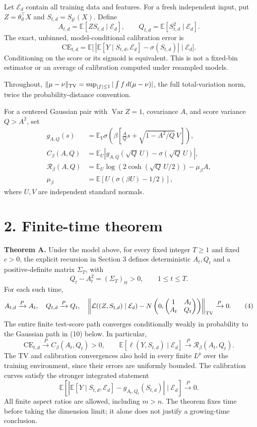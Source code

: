 \documentclass[
  11pt,
  a4paper,
]{article}
\begin{document}
Let \(\mathcal E_d\) contain all training data and features. For a fresh
independent input, put \(Z=\theta_d^\top X\) and \(S_{t,d}=S_{b^t}(X)\).
Define \[
A_{t,d}=\mathbb E[ZS_{t,d}\mid\mathcal E_d],\qquad
Q_{t,d}=\mathbb E[S_{t,d}^2\mid\mathcal E_d].
\] The exact, unbinned, model-conditional calibration error is \[
\mathrm{CE}_{t,d}=\mathbb E\big[\,|\mathbb E[Y\mid S_{t,d},\mathcal E_d]-\sigma(S_{t,d})|\mid\mathcal E_d\big]. \tag{2}
\] Conditioning on the score or its sigmoid is equivalent. This is not a
fixed-bin estimator or an average of calibration computed under
resampled models.

Throughout, \(\|\mu-\nu\|_{\rm TV}=\sup_{|f|\le1}|\int f\,d(\mu-\nu)|\),
the full total-variation norm, twice the probability-distance
convention.

For a centered Gaussian pair with \(\operatorname{Var}Z=1\), covariance
\(A\), and score variance \(Q>A^2\), set \[
\begin{aligned}
g_{A,Q}(s)&=\mathbb E_V\sigma\left(\beta\left[\frac AQs+\sqrt{1-A^2/Q}\,V\right]\right),\\
C_\beta(A,Q)&=\mathbb E_U\left|g_{A,Q}(\sqrt Q\,U)-\sigma(\sqrt Q\,U)\right|,\\
\mathcal R_\beta(A,Q)&=\mathbb E_U\log\left(2\cosh(\sqrt Q\,U/2)\right)-\mu_\beta A,\\
\mu_\beta&=\mathbb E[U(\sigma(\beta U)-1/2)],
\end{aligned} \tag{3}
\] where \(U,V\) are independent standard normals.

\hypertarget{finite-time-theorem}{%
\section{2. Finite-time theorem}\label{finite-time-theorem}}

\textbf{Theorem A.} Under the model above, for every fixed integer
\(T\ge1\) and fixed \(c>0\), the explicit recursion in Section 3 defines
deterministic \(A_t,Q_t\) and a positive-definite matrix \(\Sigma_T\),
with \[
Q_t-A_t^2=(\Sigma_T)_{tt}>0,\qquad 1\le t\le T.
\] For each such time, \[
A_{t,d}\xrightarrow{P}A_t,\quad Q_{t,d}\xrightarrow{P}Q_t,\quad
\left\|\mathcal L((Z,S_{t,d})\mid\mathcal E_d)-
N\left(0,\begin{pmatrix}1&A_t\\A_t&Q_t\end{pmatrix}\right)\right\|_{\rm TV}
\xrightarrow{P}0. \tag{4}
\] The entire finite test-score path converges conditionally weakly in
probability to the Gaussian path in (10) below. In particular, \[
\mathrm{CE}_{t,d}\xrightarrow{P}C_\beta(A_t,Q_t)>0,\qquad
\mathbb E[\ell(Y,S_{t,d})\mid\mathcal E_d]\xrightarrow{P}\mathcal R_\beta(A_t,Q_t). \tag{5}
\] The TV and calibration convergences also hold in every finite \(L^p\)
over the training environment, since their errors are uniformly bounded.
The calibration curves satisfy the stronger integrated statement \[
\mathbb E\left[\left|\mathbb E[Y\mid S_{t,d},\mathcal E_d]-g_{A_t,Q_t}(S_{t,d})\right|\mid\mathcal E_d\right]\xrightarrow{P}0. \tag{6}
\] All finite aspect ratios are allowed, including \(m>n\). The theorem
fixes time before taking the dimension limit; it alone does not justify
a growing-time conclusion.
\end{document}
